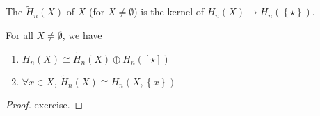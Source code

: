 \begin{definition}\label{def:reduced-homology}
    The  $\tilde{H}_n(X)$ of $X$ (for  $X\neq \emptyset$) is the kernel of $H_n(X) \to  H_n(\left \{\star\right\} )$. 
\end{definition}

\begin{lemma}\label{lm:reduced-homology-and-homology-relations-facts}
    For all $X\neq \emptyset$, we have
    \begin{enumerate}[1)]
        \item $H_n(X) \cong \tilde{H}_n(X) \oplus H_n(\left[ \star \right] )$
        \item $\forall x\in X$, $\tilde{H}_n(X)\cong H_n(X,\left \{x\right\} )$
    \end{enumerate}
\end{lemma}

\begin{proof}
    exercise.
\end{proof}

